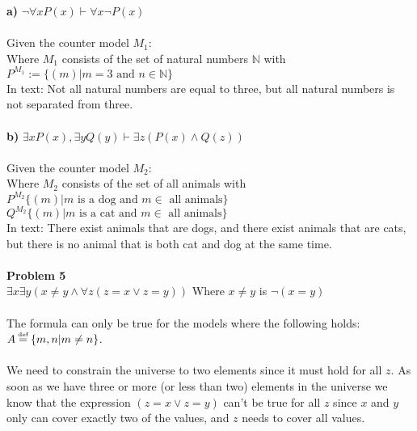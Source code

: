 \documentclass[12pt,oneside,reqno]{amsart}
\begin{document}
\textbf{a) }$\neg \forall x P(x) \vdash \forall x \neg P(x)$\\\\
Given the counter model $M_1$:\\
Where $M_1$ consists of the set of natural numbers $\mathbb{N}$ with\\
$P^{M_1} := \{(m) | m=3 \text{ and } n \in \mathbb{N}\}$\\
In text: Not all natural numbers are equal to three, but all natural numbers is not separated from three.\\\\
\textbf{b) }$\exists x P(x), \exists y Q(y) \vdash \exists z(P(x) \land Q(z))$\\\\
Given the counter model $M_2$:\\
Where $M_2$ consists of the set of all animals with\\
$P^{M_2}\{(m)|m \text{ is a dog and } m \in \text{ all animals}\}$\\
$Q^{M_2}\{(m)|m \text{ is a cat and } m \in \text{ all animals}\}$\\
In text: There exist animals that are dogs, and there exist animals that are cats, but there is no animal that is both cat and dog at the same time.\\\\
\textbf{Problem 5}\\
$\exists x \exists y (x\not= y \land \forall z (z=x \lor z=y))$ Where $x\not=y$ is $\neg(x=y)$\\\\
The formula can only be true for the models where the following holds:\\
$A \deff \{m,n | m\not=n \}$.\\\\
We need to constrain the universe to two elements since it must hold for all $z$. As soon as we have three or more (or less than two) elements in the universe we know that the expression $(z=x \lor z=y)$ can't be true for all $z$ since $x$ and $y$ only can cover exactly two of the values, and $z$ needs to cover all values.
\end{document}
